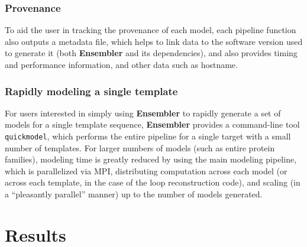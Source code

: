\documentclass[aps,pre,twocolumn,nofootinbib,superscriptaddress,linenumbers]{revtex4-1}
\begin{document}
\subsubsection*{Provenance}

To aid the user in tracking the provenance of each model, each pipeline function also outputs a metadata file, which helps to link data to the software version used to generate it (both {\bf Ensembler} and its dependencies), and also provides timing and performance information, and other data such as hostname.

\subsubsection*{Rapidly modeling a single template}

For users interested in simply using {\bf Ensembler} to rapidly generate a set of models for a single template sequence, {\bf Ensembler} provides a command-line tool {\tt quickmodel}, which performs the entire pipeline for a single target with a small number of templates.
For larger numbers of models (such as entire protein families), modeling time is greatly reduced by using the main modeling pipeline, which is parallelized via MPI, distributing computation across each model (or across each template, in the case of the loop reconstruction code), and scaling (in a ``pleasantly parallel'' manner) up to the number of models generated.









\label{section:design}

\section{Results}
\label{section:results}
\end{document}
